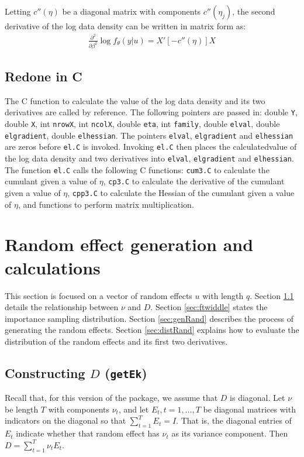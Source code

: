 \documentclass{article}
\begin{document}
Letting $ c''(\eta)$ be a diagonal matrix with components $c''(\eta_j)$, the second derivative of the log data density can be written in matrix form as:
\begin{align}
   \frac{\partial^2}{\partial \beta^2} \log f_\theta(y|u) =   X' [ -  c''(\eta) ] X
\end{align}

\subsection{Redone in C}
The C function to calculate the value of the log data density and its two derivatives are called by reference. The following pointers are passed in: double \texttt{Y}, double \texttt{X}, int \texttt{nrowX}, int \texttt{ncolX}, double \texttt{eta}, int \texttt{family}, double \texttt{elval}, double \texttt{elgradient}, double \texttt{elhessian}. The pointers  \texttt{elval}, \texttt{elgradient} and \texttt{elhessian} are zeros before \texttt{el.C} is invoked. Invoking \texttt{el.C}  then places the calculatedvalue of the log data density and two derivatives into \texttt{elval}, \texttt{elgradient} and \texttt{elhessian}.\\

The function \texttt{el.C} calls the following C functions: \texttt{cum3.C} to calculate the cumulant given a value of $\eta$, \texttt{cp3.C} to calculate the derivative of the cumulant given a value of $\eta$, \texttt{cpp3.C} to calculate the Hessian of the cumulant given a value of $\eta$, and functions to perform matrix multiplication.


\section{Random effect generation and calculations}
This section is focused on a vector of random effects $u$ with length $q$.  Section \ref{sec:getEk} details the  relationship between  $\nu$ and $D$.
Section \ref{sec:ftwiddle} states the importance sampling distribution.
 Section \ref{sec:genRand} describes the process of generating the random effects. Section \ref{sec:distRand} explains how to evaluate the distribution of the random effects and its first two derivatives.

\subsection{Constructing $D$ (\texttt{getEk})}\label{sec:getEk}
Recall that, for this version of the package, we assume that $D$ is diagonal.  Let $\nu$ be length $T$ with components $\nu_t$, and let $E_t,t=1,\ldots,T$ be diagonal matrices with indicators on the diagonal so that $\sum_{t=1}^T E_t = I$. That is, the diagonal entries  of $E_t$ indicate whether that random effect has $\nu_t$ as its variance component. Then $D=\sum_{t=1}^T\nu_t  E_t $.  
\end{document}
